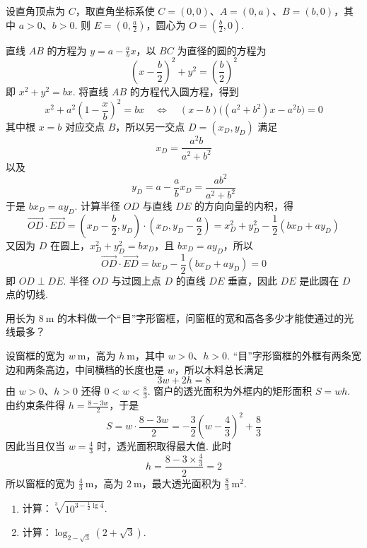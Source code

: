 \begin{solution}
设直角顶点为 \(C\)，取直角坐标系使 \(C=(0,0)\)、\(A=(0,a)\)、\(B=(b,0)\)，其中 \(a>0\)、\(b>0\). 则 \(E=\left(0,\frac a2\right)\)，圆心为 \(O=\left(\frac b2,0\right)\).

直线 \(AB\) 的方程为 \(y=a-\frac abx\)，以 \(BC\) 为直径的圆的方程为
\[
\left(x-\frac b2\right)^2+y^2=\left(\frac b2\right)^2
\]
即 \(x^2+y^2=bx\). 将直线 \(AB\) 的方程代入圆方程，得到
\[
x^2+a^2\left(1-\frac xb\right)^2=bx
\quad\Longleftrightarrow\quad
(x-b)\bigl((a^2+b^2)x-a^2b\bigr)=0
\]
其中根 \(x=b\) 对应交点 \(B\)，所以另一交点 \(D=(x_D,y_D)\) 满足
\[
x_D=\frac{a^2b}{a^2+b^2}
\]
以及
\[
y_D=a-\frac abx_D=\frac{ab^2}{a^2+b^2}
\]
于是 \(bx_D=ay_D\). 计算半径 \(OD\) 与直线 \(DE\) 的方向向量的内积，得
\[
\overrightarrow{OD}\cdot\overrightarrow{ED}
=\left(x_D-\frac b2,y_D\right)\cdot\left(x_D,y_D-\frac a2\right)
=x_D^2+y_D^2-\frac12\left(bx_D+ay_D\right)
\]
又因为 \(D\) 在圆上，\(x_D^2+y_D^2=bx_D\)，且 \(bx_D=ay_D\)，所以
\[
\overrightarrow{OD}\cdot\overrightarrow{ED}=bx_D-\frac12\left(bx_D+ay_D\right)=0
\]
即 \(OD\perp DE\). 半径 \(OD\) 与过圆上点 \(D\) 的直线 \(DE\) 垂直，因此 \(DE\) 是此圆在 \(D\) 点的切线.
\end{solution}

\begin{problem}
用长为 \(8 \mathrm{~m}\) 的木料做一个“目”字形窗框，问窗框的宽和高各多少才能使通过的光线最多？
\end{problem}

\begin{solution}
设窗框的宽为 \(w\mathrm{~m}\)，高为 \(h\mathrm{~m}\)，其中 \(w>0\)、\(h>0\). “目”字形窗框的外框有两条宽边和两条高边，中间横档的长度也是 \(w\)，所以木料总长满足
\[
3w+2h=8
\]
由 \(w>0\)、\(h>0\) 还得 \(0<w<\frac83\). 窗户的透光面积为外框内的矩形面积 \(S=wh\). 由约束条件得 \(h=\frac{8-3w}{2}\)，于是
\[
S=w\cdot\frac{8-3w}{2}=-\frac32\left(w-\frac43\right)^2+\frac83
\]
因此当且仅当 \(w=\frac43\) 时，透光面积取得最大值. 此时
\[
h=\frac{8-3\times\frac43}{2}=2
\]
所以窗框的宽为 \(\frac43\mathrm{~m}\)，高为 \(2\mathrm{~m}\)，最大透光面积为 \(\frac83\mathrm{~m}^2\).
\end{solution}

\begin{problem}
\begin{enumerate}
    \item 计算：\(\sqrt[3]{10^{3-\frac{1}{2}\lg 4}}\).

    \item 计算：\(\log_{2-\sqrt{3}}\left(2+\sqrt{3}\right)\).
\end{enumerate}
\end{problem}


